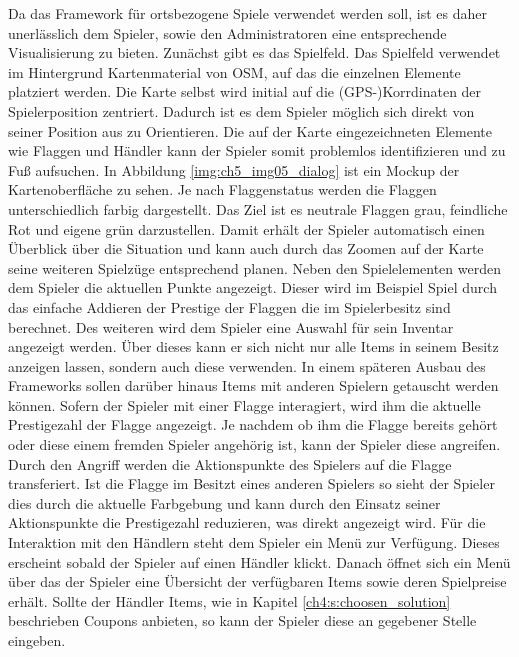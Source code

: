 Da das Framework für ortsbezogene Spiele verwendet werden soll, ist es daher unerlässlich dem Spieler, sowie den Administratoren eine entsprechende Visualisierung zu bieten. Zunächst gibt es das Spielfeld. Das Spielfeld verwendet im Hintergrund Kartenmaterial von OSM, auf das die einzelnen Elemente platziert werden. Die Karte selbst wird initial auf die (GPS-)Korrdinaten der Spielerposition zentriert. Dadurch ist es dem Spieler möglich sich direkt von seiner Position aus zu Orientieren. Die auf der Karte eingezeichneten Elemente wie Flaggen und Händler kann der Spieler somit problemlos identifizieren und zu Fuß aufsuchen. In Abbildung \ref{img:ch5_img05_dialog} ist ein Mockup der Kartenoberfläche zu sehen. Je nach Flaggenstatus werden die Flaggen unterschiedlich farbig dargestellt. Das Ziel ist es neutrale Flaggen grau, feindliche Rot und eigene grün darzustellen. Damit erhält der Spieler automatisch einen Überblick über die Situation und kann auch durch das Zoomen auf der Karte seine weiteren Spielzüge entsprechend planen.
Neben den Spielelementen werden dem Spieler die aktuellen Punkte angezeigt. Dieser wird im Beispiel Spiel durch das einfache Addieren der Prestige der Flaggen die im Spielerbesitz sind berechnet. Des weiteren wird dem Spieler eine Auswahl für sein Inventar angezeigt werden.
Über dieses kann er sich nicht nur alle Items in seinem Besitz anzeigen lassen, sondern auch diese verwenden. In einem späteren Ausbau des Frameworks sollen darüber hinaus Items mit anderen Spielern getauscht werden können.
Sofern der Spieler mit einer Flagge interagiert, wird ihm die aktuelle Prestigezahl der Flagge angezeigt. Je nachdem ob ihm die Flagge bereits gehört oder diese einem fremden Spieler angehörig ist, kann der Spieler diese \glqq angreifen\grqq{}. Durch den Angriff werden die Aktionspunkte des Spielers auf die Flagge transferiert. Ist die Flagge im Besitzt eines anderen Spielers so sieht der Spieler dies durch die aktuelle Farbgebung und kann durch den Einsatz seiner Aktionspunkte die Prestigezahl reduzieren, was direkt angezeigt wird. Für die Interaktion mit den Händlern steht dem Spieler ein Menü zur Verfügung. Dieses erscheint sobald der Spieler auf einen Händler klickt. Danach öffnet sich ein Menü über das der Spieler eine Übersicht der verfügbaren Items sowie deren Spielpreise erhält. Sollte der Händler Items, wie in Kapitel \ref{ch4:s:choosen_solution} beschrieben Coupons anbieten, so kann der Spieler diese an gegebener Stelle eingeben.

